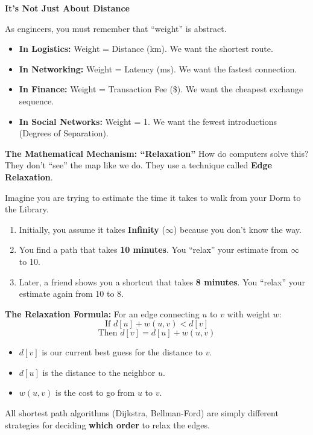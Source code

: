 \documentclass[
  letterpaper,
  DIV=11,
  numbers=noendperiod]{scrreprt}
\providecommand{\tightlist}{%
  \setlength{\itemsep}{0pt}\setlength{\parskip}{0pt}}
\begin{document}
\textbf{It's Not Just About Distance}

As engineers, you must remember that ``weight'' is abstract.

\begin{itemize}
\tightlist
\item
  \textbf{In Logistics:} Weight = Distance (km). We want the shortest
  route.
\item
  \textbf{In Networking:} Weight = Latency (ms). We want the fastest
  connection.
\item
  \textbf{In Finance:} Weight = Transaction Fee (\$). We want the
  cheapest exchange sequence.
\item
  \textbf{In Social Networks:} Weight = 1. We want the fewest
  introductions (Degrees of Separation).
\end{itemize}

\textbf{The Mathematical Mechanism: ``Relaxation''} How do computers
solve this? They don't ``see'' the map like we do. They use a technique
called \textbf{Edge Relaxation}.

Imagine you are trying to estimate the time it takes to walk from your
Dorm to the Library.

\begin{enumerate}
\def\labelenumi{\arabic{enumi}.}
\tightlist
\item
  Initially, you assume it takes \textbf{Infinity} (\(\infty\)) because
  you don't know the way.
\item
  You find a path that takes \textbf{10 minutes}. You ``relax'' your
  estimate from \(\infty\) to 10.
\item
  Later, a friend shows you a shortcut that takes \textbf{8 minutes}.
  You ``relax'' your estimate again from 10 to 8.
\end{enumerate}

\textbf{The Relaxation Formula:} For an edge connecting \(u\) to \(v\)
with weight \(w\): \[
\text{If } d[u] + w(u, v) < d[v]
\] \[
\text{Then } d[v] = d[u] + w(u, v)
\]

\begin{itemize}
\tightlist
\item
  \(d[v]\) is our current best guess for the distance to \(v\).
\item
  \(d[u]\) is the distance to the neighbor \(u\).
\item
  \(w(u,v)\) is the cost to go from \(u\) to \(v\).
\end{itemize}

All shortest path algorithms (Dijkstra, Bellman-Ford) are simply
different strategies for deciding \textbf{which order} to relax the
edges.
\end{document}
